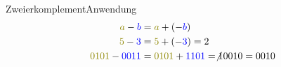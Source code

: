 \documentclass[xelatex,aspectratio=169]{beamer}
\begin{document}
\begin{frame}{Zweierkomplement}{Anwendung}
  \begin{align*}
    \textcolor{olive}{a} - \textcolor{blue}{b}       & = \textcolor{olive}{a} + (-\textcolor{blue}{b})                         \\
    \textcolor{olive}{5} - \textcolor{blue}{3}       & = \textcolor{olive}{5} + (-\textcolor{blue}{3}) = 2                     \\
    \textcolor{olive}{0101} - \textcolor{blue}{0011} & = \textcolor{olive}{0101} + \textcolor{blue}{1101} = \not{1}0010 = 0010 \\
  \end{align*}
\end{frame}
\end{document}
